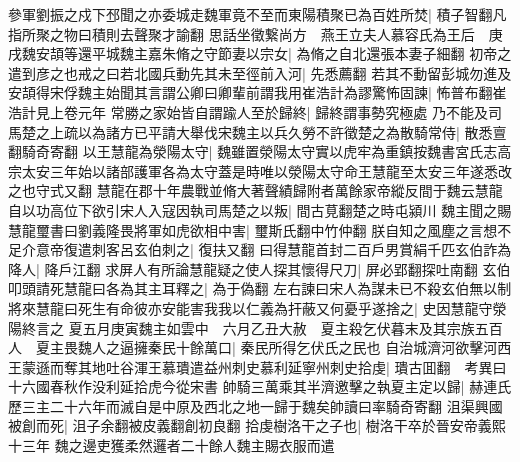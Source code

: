 參軍劉振之戍下邳聞之亦委城走魏軍竟不至而東陽積聚已為百姓所焚|{
	積子智翻凡指所聚之物曰積則去聲聚才諭翻}
思話坐徵繋尚方　燕王立夫人慕容氏為王后　庚戌魏安頡等還平城魏主嘉朱脩之守節妻以宗女|{
	為脩之自北還張本妻子細翻}
初帝之遣到彦之也戒之曰若北國兵動先其未至徑前入河|{
	先悉薦翻}
若其不動留彭城勿進及安頡得宋俘魏主始聞其言謂公卿曰卿輩前謂我用崔浩計為謬驚怖固諫|{
	怖普布翻崔浩計見上卷元年}
常勝之家始皆自謂踰人至於歸終|{
	歸終謂事勢究極處}
乃不能及司馬楚之上疏以為諸方已平請大舉伐宋魏主以兵久勞不許徵楚之為散騎常侍|{
	散悉亶翻騎奇寄翻}
以王慧龍為滎陽太守|{
	魏雖置滎陽太守實以虎牢為重鎮按魏書宮氏志高宗太安三年始以諸部護軍各為太守蓋是時唯以滎陽太守命王慧龍至太安三年遂悉改之也守式又翻}
慧龍在郡十年農戰並脩大著聲績歸附者萬餘家帝縱反間于魏云慧龍自以功高位下欲引宋人入寇因執司馬楚之以叛|{
	間古莧翻楚之時屯潁川}
魏主聞之賜慧龍璽書曰劉義隆畏將軍如虎欲相中害|{
	璽斯氏翻中竹仲翻}
朕自知之風塵之言想不足介意帝復遣刺客呂玄伯刺之|{
	復扶又翻}
曰得慧龍首封二百戶男賞絹千匹玄伯詐為降人|{
	降戶江翻}
求屏人有所論慧龍疑之使人探其懷得尺刀|{
	屏必郢翻探吐南翻}
玄伯叩頭請死慧龍曰各為其主耳釋之|{
	為于偽翻}
左右諫曰宋人為謀未已不殺玄伯無以制將來慧龍曰死生有命彼亦安能害我我以仁義為扞蔽又何憂乎遂捨之|{
	史因慧龍守滎陽終言之}
夏五月庚寅魏主如雲中　六月乙丑大赦　夏主殺乞伏暮末及其宗族五百人　夏主畏魏人之逼擁秦民十餘萬口|{
	秦民所得乞伏氏之民也}
自治城濟河欲擊河西王蒙遜而奪其地吐谷渾王慕璝遣益州刺史慕利延寧州刺史拾虔|{
	璝古囬翻　考異曰十六國春秋作没利延拾虎今從宋書}
帥騎三萬乘其半濟邀擊之執夏主定以歸|{
	赫連氏歷三主二十六年而滅自是中原及西北之地一歸于魏矣帥讀曰率騎奇寄翻}
沮渠興國被創而死|{
	沮子余翻被皮義翻創初良翻}
拾虔樹洛干之子也|{
	樹洛干卒於晉安帝義熙十三年}
魏之邊吏獲柔然邏者二十餘人魏主賜衣服而遣

